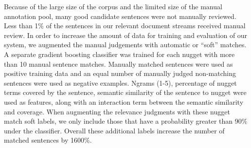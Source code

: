  Because of the large size of the corpus and the limited size of the manual
 annotation pool,
 many good candidate sentences were not manually reviewed.
 Less than 1\% of the sentences in our relevant document streams received
 manual review.  In order to increase the amount of data for training and
 evaluation of our system, we augmented the manual judgements with automatic
 or ``soft'' matches. A separate gradient boosting classifier was trained for
 each nugget with more than 10 manual sentence matches.  Manually matched
 sentences were used as positive training data and an equal number of
 manually judged non-matching sentences were used as negative examples.
 Ngrams (1-5), percentage of nugget terms covered by the sentence,
 semantic similarity of the sentence to nugget were used as features, along
 with an interaction term between the semantic similarity and coverage. When
 augmenting the relevance judgments with these nugget match soft labels, we
 only include those that have a probability greater than 90\% under the
 classifier. Overall these additional labels increase the number of matched
 sentences by 1600\%.
 





